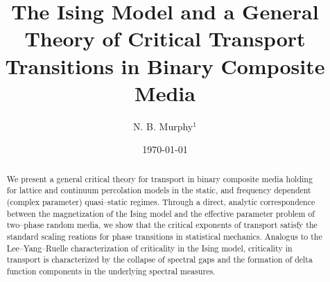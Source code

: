 \documentclass[english,12pt,jmp,graphicx]{revtex4-1}
\begin{document}

\title{The Ising Model and a General Theory of Critical Transport
  Transitions in Binary Composite Media} %



\author{N. B. Murphy$^1$}
%


\date{\today}

\begin{abstract}
%
We present a general critical theory for transport in binary
composite media holding for lattice and continuum percolation
models in the static, and frequency dependent (complex parameter) quasi--static
regimes. Through a direct, analytic correspondence between the 
magnetization of the Ising model and the effective parameter problem
of two--phase random media, we show that the critical exponents of
transport satisfy the standard scaling reations for phase transitions
in statistical mechanics. Analogus to the Lee--Yang--Ruelle
characterization of criticality in the Ising model, criticality in
transport is characterized by the collapse of spectral gaps and the
formation of delta function components in the underlying spectral measures.    
%
\end{abstract}
\end{document}
